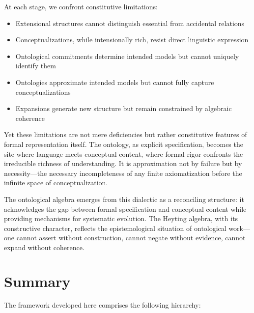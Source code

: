 \documentclass[12pt,a4paper]{article}
\begin{document}
At each stage, we confront constitutive limitations:
\begin{itemize}
    \item Extensional structures cannot distinguish essential from accidental relations
    \item Conceptualizations, while intensionally rich, resist direct linguistic expression
    \item Ontological commitments determine intended models but cannot uniquely identify them
    \item Ontologies approximate intended models but cannot fully capture conceptualizations
    \item Expansions generate new structure but remain constrained by algebraic coherence
\end{itemize}

Yet these limitations are not mere deficiencies but rather constitutive features of formal representation itself. The ontology, as explicit specification, becomes the site where language meets conceptual content, where formal rigor confronts the irreducible richness of understanding. It is approximation not by failure but by necessity---the necessary incompleteness of any finite axiomatization before the infinite space of conceptualization.

The ontological algebra emerges from this dialectic as a reconciling structure: it acknowledges the gap between formal specification and conceptual content while providing mechanisms for systematic evolution. The Heyting algebra, with its constructive character, reflects the epistemological situation of ontological work---one cannot assert without construction, cannot negate without evidence, cannot expand without coherence.

\section{Summary}

The framework developed here comprises the following hierarchy:
\end{document}
